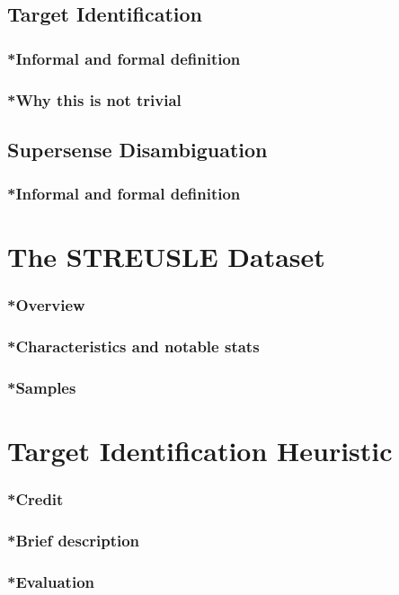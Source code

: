 \subsection{Target Identification}\label{sec:probform_ident}
\subsubsection{*Informal and formal definition}
\subsubsection{*Why this is not trivial}
\subsection{Supersense Disambiguation}\label{sec:probform_disam}
\subsubsection{*Informal and formal definition}

\section{The STREUSLE Dataset}\label{sec:streusle}
\subsubsection{*Overview}
\subsubsection{*Characteristics and notable stats}
\subsubsection{*Samples}

\section{Target Identification Heuristic} \label{sec:ident}
\subsubsection{*Credit}
\subsubsection{*Brief description}
\subsubsection{*Evaluation}


